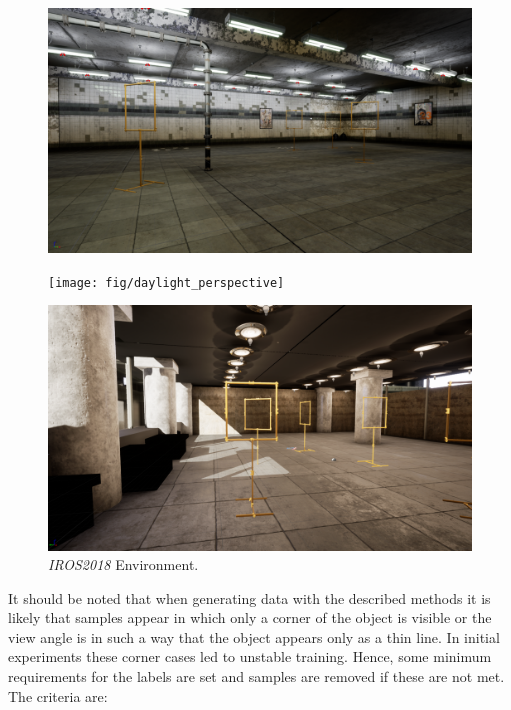 \begin{figure}[hbtp]
	\centering
	\begin{minipage}{0.3\textwidth}
		\includegraphics[width=\textwidth]{fig/basement_perspective}
	\end{minipage}
	\begin{minipage}{0.3\textwidth}
		\texttt{[image: fig/daylight\_perspective]}
	\end{minipage}
	\begin{minipage}{0.3\textwidth}
		\includegraphics[width=\textwidth]{fig/iros_perspective}
	\end{minipage}
	\caption{\textit{IROS2018} Environment.}
	\label{fig:environments}
\end{figure}



It should be noted that when generating data with the described methods it is likely that samples appear in which only a corner of the object is visible or the view angle is in such a way that the object appears only as a thin line. In initial experiments these corner cases led to unstable training. Hence, some minimum requirements for the labels are set and samples are removed if these are not met. The criteria are:

